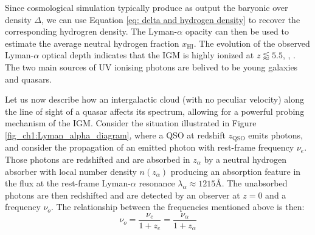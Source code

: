 Since cosmological simulation typically produce as output the baryonic over density $\Delta$, we can use Equation \ref{eq: delta and hydrogen density} to recover the corresponding hydrogren density. The Lyman-$\alpha$ opacity can then be used to estimate the average neutral hydrogen fraction $x_\text{HI}$. The evolution of the observed Lyman-$\alpha$ optical depth indicates that the IGM is highly ionized at $z\lessapprox 5.5$, \cite{Becker_2001_GP_trough}, \cite{Ian_model_inde_reio}. The two main sources of UV ionising photons are belived to be young galaxies and quasars.




















Let us now describe how an intergalactic cloud (with no peculiar velocity) along the line of sight of a quasar affects its spectrum, allowing for a powerful probing mechanism of the IGM. Consider the situation illustrated in Figure \ref{fig_ch1:Lyman_alpha_diagram}, where a QSO at redshift $z_\text{QSO}$ emits photons, and consider the propagation of an emitted photon with rest-frame frequency $\nu_e$. Those photons are redshifted and are absorbed in $z_\alpha$ by a neutral hydrogen absorber with local number density $n(z_\alpha)$ producing an absorption feature in the flux at the rest-frame Lyman-$\alpha$ resonance $\lambda_\alpha \approx 1215$\r{A}. The unabsorbed photons are then redshifted and are detected by an observer at $z=0$ and a frequency $\nu_o$. The relationship between the frequencies mentioned above is then:
\begin{equation}
    \nu_o=\frac{\nu_e}{1+z_e}=\frac{\nu_\alpha}{1+z_\alpha} 
\end{equation}

